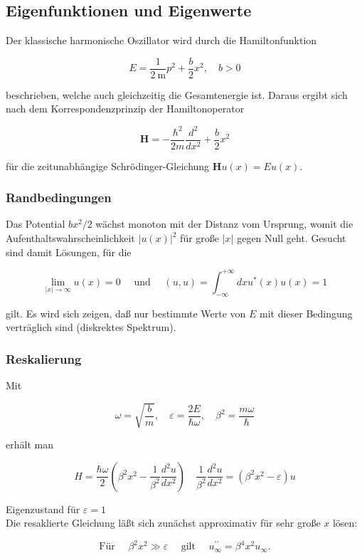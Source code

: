 \documentclass[10pt, letterpaper]{article}
\begin{document}
\subsection*{Eigenfunktionen und Eigenwerte}
Der klassische harmonische Oszillator wird durch die Hamiltonfunktion

$$
E=\frac{1}{2 \mathrm{~m}} p^{2}+\frac{b}{2} x^{2}, \quad b>0
$$

beschrieben, welche auch gleichzeitig die Gesamtenergie ist. Daraus ergibt sich nach dem Korrespondenzprinzip der Hamiltonoperator

$$
\mathbf{H}=-\frac{\hbar^{2}}{2 m} \frac{d^{2}}{d x^{2}}+\frac{b}{2} x^{2}
$$

für die zeitunabhängige Schrödinger-Gleichung $\mathbf{H} u(x)=E u(x)$.

\subsubsection*{Randbedingungen}
Das Potential $b x^{2} / 2$ wächst monoton mit der Distanz vom Ursprung, womit die Aufenthaltswahrscheinlichkeit $|u(x)|^{2}$ für große $|x|$ gegen Null geht. Gesucht sind damit Lösungen, für die

$$
\lim _{|x| \rightarrow \infty} u(x)=0 \quad \text { und } \quad(u, u)=\int_{-\infty}^{+\infty} d x u^{*}(x) u(x)=1
$$

gilt. Es wird sich zeigen, daß nur bestimmte Werte von $E$ mit dieser Bedingung verträglich sind (diskrektes Spektrum).

\subsubsection*{Reskalierung}
Mit

$$
\omega=\sqrt{\frac{b}{m}}, \quad \varepsilon=\frac{2 E}{\hbar \omega}, \quad \beta^{2}=\frac{m \omega}{\hbar}
$$

erhält man

$$
H=\frac{\hbar \omega}{2}\left(\beta^{2} x^{2}-\frac{1}{\beta^{2}} \frac{d^{2} u}{d x^{2}}\right) \quad \frac{1}{\beta^{2}} \frac{d^{2} u}{d x^{2}}=\left(\beta^{2} x^{2}-\varepsilon\right) u
$$

Eigenzustand für $\varepsilon=1$\\
Die resaklierte Gleichung läßt sich zunächst approximativ für sehr große $x$ lösen:

$$
\text { Für } \quad \beta^{2} x^{2} \gg \varepsilon \quad \text { gilt } \quad u_{\infty}^{\prime \prime}=\beta^{4} x^{2} u_{\infty} \text {. }
$$
\end{document}
